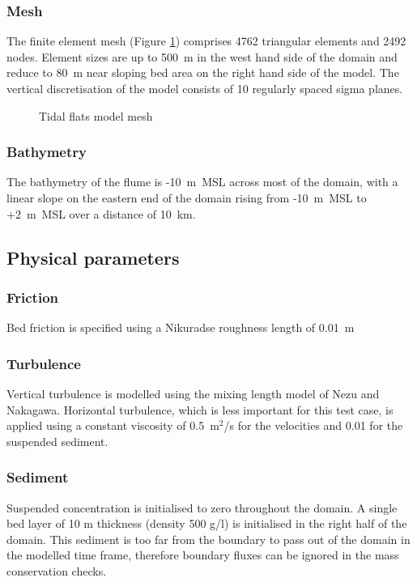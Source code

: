\subsubsection{Mesh}
%
The finite element mesh (Figure \ref{mesh}) comprises 4762 triangular elements and
2492 nodes. Element sizes are up to 500~m in the west hand side of the domain
and reduce to 80~m near sloping bed area on the right hand side of the model. 
The vertical discretisation of the model consists of 10 regularly spaced sigma planes.

\begin{figure} [h]
\centering
{}
\caption{Tidal flats model mesh}\label{mesh}
\end{figure}

%
\subsubsection{Bathymetry}
%
The bathymetry of the flume is -10~m~MSL across most of the domain, with a 
linear slope on the eastern end of the domain rising from -10~m~MSL to +2~m~MSL 
over a distance of 10~km. 
%
%
%
\subsection{Physical parameters}
%
\subsubsection{Friction}
Bed friction is specified using a Nikuradse roughness length of 0.01~m

\subsubsection{Turbulence}
Vertical turbulence is modelled using the mixing length model of Nezu
and Nakagawa. Horizontal turbulence, which is less important for this
test case, is applied using a constant viscosity of 0.5~m$^2$/s for the
velocities and 0.01 for the suspended sediment.

\subsubsection{Sediment}
Suspended concentration is initialised to zero throughout the domain. A single bed
layer of 10 m thickness (density 500 g/l) is initialised in the right half of the domain. 
This sediment is too far from the boundary to pass out of the domain in the modelled 
time frame, therefore boundary fluxes can be ignored in the mass conservation checks. 

